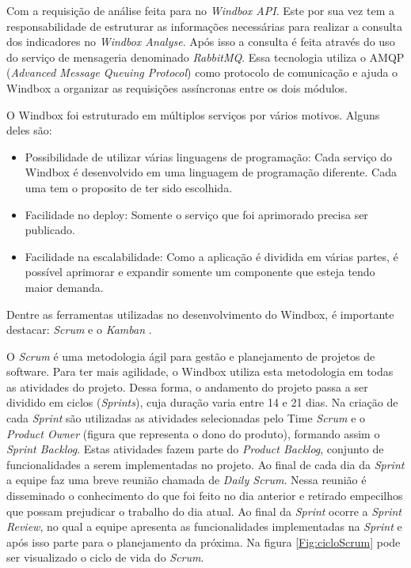 Com a requisição de análise feita para no \textit{Windbox API}. Este por sua vez tem a responsabilidade de estruturar as informações necessárias para realizar a consulta dos indicadores no \textit{Windbox Analyse}. Após isso a consulta é feita através do uso do serviço de mensageria denominado \textit{RabbitMQ}. Essa tecnologia utiliza o AMQP (\textit{Advanced Message Queuing Protocol}) como protocolo de comunicação e ajuda o Windbox a organizar as requisições assíncronas entre os dois módulos.

O Windbox foi estruturado em múltiplos serviços por vários motivos. Alguns deles são: 

\begin{itemize}
    \item Possibilidade de utilizar várias linguagens de programação: Cada serviço do Windbox é desenvolvido em uma linguagem de programação diferente. Cada uma tem o proposito de ter sido escolhida.
    \item Facilidade no deploy: Somente o serviço que foi aprimorado precisa ser publicado.
    \item Facilidade na escalabilidade: Como a aplicação é dividida em várias partes, é possível aprimorar e expandir somente um componente que esteja tendo maior demanda.
\end{itemize}

Dentre as ferramentas utilizadas no desenvolvimento do Windbox, é importante destacar: \textit{Scrum} \cite{agile-project-scrum} e o \textit{Kamban} \cite{kamban-scrum}.

O \textit{Scrum} é uma metodologia ágil para gestão e planejamento de projetos de software. Para ter mais agilidade, o Windbox utiliza esta metodologia em todas as atividades do projeto. Dessa forma, o andamento do projeto passa a ser dividido em ciclos (\textit{Sprints}), cuja duração varia entre 14 e 21 dias. Na criação de cada \textit{Sprint} são utilizadas as atividades selecionadas pelo Time \textit{Scrum} e o \textit{Product Owner} (figura que representa o dono do produto), formando assim o \textit{Sprint Backlog}. Estas atividades fazem parte do \textit{Product Backlog}, conjunto de funcionalidades a serem implementadas no projeto. Ao final de cada dia da \textit{Sprint} a equipe faz uma breve reunião chamada de \textit{Daily Scrum}. Nessa reunião é disseminado o conhecimento do que foi feito no dia anterior e retirado empecilhos que possam prejudicar o trabalho do dia atual. Ao final da \textit{Sprint} ocorre a \textit{Sprint Review}, no qual a equipe apresenta as funcionalidades implementadas na \textit{Sprint} e após isso parte para o planejamento da próxima. Na figura \ref{Fig:cicloScrum} pode ser visualizado o ciclo de vida do \textit{Scrum}.

